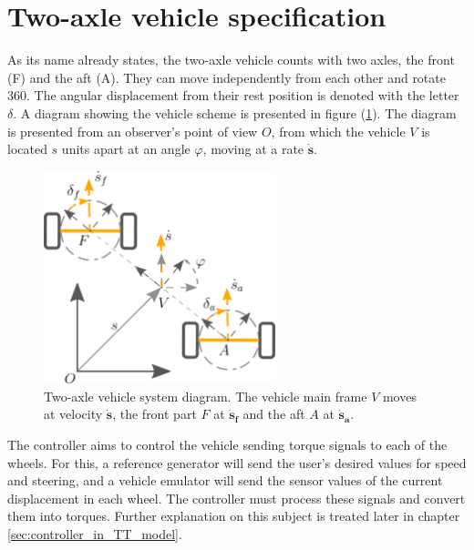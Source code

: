 \documentclass[table,xcdraw]{article}
\begin{document}

\newpage
\section{Two-axle vehicle specification} \label{sec:two_axle_veh_spec}
As its name already states, the two-axle vehicle counts with two axles, the front (F) and the aft (A). They can move independently from each other and rotate 360\degree. The angular displacement from their rest position is denoted with the letter $\delta$. A diagram showing the vehicle scheme is presented in figure (\ref{fig:2Axle_Vehicle_Scheme}). The diagram is presented from an observer's point of view $O$, from which the vehicle $V$ is located $s$ units apart at an angle $\varphi$, moving at a rate $\boldsymbol{\dot{s}}$.\\

\begin{figure}[h!]
    \centering
    \includegraphics[width=0.6\textwidth]{figures/literature_survey/2Axle Vehicle Scheme.png}
    \caption{Two-axle vehicle system diagram. The vehicle main frame $V$ moves at velocity $\boldsymbol{\dot{s}}$, the front part $F$ at $\boldsymbol{\dot{s}_f}$ and the aft $A$ at $\boldsymbol{\dot{s}_a}$.}
    \label{fig:2Axle_Vehicle_Scheme}
\end{figure}

The controller aims to control the vehicle sending torque signals to each of the wheels. For this, a reference generator will send the user's desired values for speed and steering, and a vehicle emulator will send the sensor values of the current displacement in each wheel. The controller must process these signals and convert them into torques. Further explanation on this subject is treated later in chapter \ref{sec:controller_in_TT_model}.\\
\end{document}
